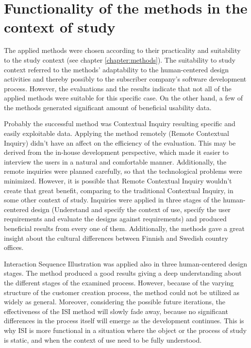 \documentclass[12pt,a4paper,oneside,pdftex]{report}
\begin{document}
\section{Functionality of the methods in the context of study}
The applied methods were chosen according to their practicality and suitability to the study context (see chapter \ref{chapter:methods}). The suitability to study context referred to the methods' adaptability to the human-centered design activities and thereby possibly to the subscriber company's software development process. However, the evaluations and the results indicate that not all of the applied methods were suitable for this specific case. On the other hand, a few of the methods generated significant amount of beneficial usability data. 

Probably the successful method was Contextual Inquiry resulting specific and easily exploitable data. Applying the method remotely (Remote Contextual Inquiry) didn't have an affect on the efficiency of the evaluation. This may be derived from the in-house development perspective, which made it easier to interview the users in a natural and comfortable manner. Additionally, the remote inquiries were planned carefully, so that the technological problems were minimized. However, it is possible that Remote Contextual Inquiry wouldn't create that great benefit, comparing to the traditional Contextual Inquiry, in some other context of study. Inquiries were applied in three stages of the human-centered design (Understand and specify the context of use, specify the user requirements and evaluate the designs against requirements) and produced beneficial results from every one of them. Additionally, the methods gave a great insight about the cultural differences between Finnish and Swedish country offices.

Interaction Sequence Illustration was applied also in three human-centered design stages. The method produced a good results giving a deep understanding about the different stages of the examined process. However, because of the varying structure of the customer creation process, the method could not be utilized as widely as general. Moreover, considering the possible future iterations, the effectiveness of the ISI method will slowly fade away, because no significant differences in the process itself will emerge as the development continues. This is why ISI is more functional in a situation where the object or the process of study is static, and when the context of use need to be fully understood. 
\end{document}
